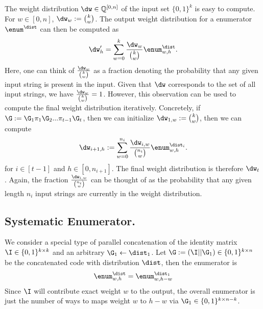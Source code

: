 The weight distribution $\dw\in \mathbb{Q}^{[0,n]}$ of the input set $\{0,1\}^k$ is easy to compute. For $w\in[0,n]$, $\dw_w:={k\choose w}$. The output weight distribution for a enumerator $\enum^\dist$ can then be computed as
$$
\dw'_{h} = \sum_{w=0}^k \frac{\dw_w}{{k\choose w}} \enum^\dist_{w,h}.
$$
Here, one can think of $ \frac{\dw_w}{{k\choose w}}$ as a fraction denoting the probability that any given input string is present in the input. Given that $\dw$ corresponds to the set of all input strings, we have $ \frac{\dw_w}{{k\choose w}}=1$.
However, this observation can be used to compute the final weight distribution iteratively. Concretely, if $\G:=\G_1\pi_1\G_2 ... \pi_{t-1}\G_t$, then we can initialize $\dw_{1,w}:={k\choose w}$, then we can compute
$$
\dw_{i+1, h}:=\sum_{w=0}^{n_i} \frac{\dw_{i,w}}{{n_i\choose w}} \enum^{\dist_i}_{w,h}.
$$
for $i\in [t-1]$ and $h\in [0,n_{i+1}]$. The final weight distribution is therefore $\dw_t$. Again, the fraction $ \frac{\dw_{i,w}}{{n_i\choose w}}$ can be thought of as the probability that any given length $n_i$ input strings are currently in the weight distribution.



\subsection{Systematic Enumerator.}\label{ssec:senum}
We consider a special type of parallel concatenation of the identity matrix $\I\in \{0,1\}^{k\times k}$ and an arbitrary $\G_1\gets\dist_1$. Let $\G:=(\I||\G_1)\in \{0,1\}^{k\times n}$ be the concatenated code with distribution $\dist$, then the enumerator is
$$
\enum^\dist_{w,h}=\enum_{w,h-w}^{\dist_1}
$$
Since $\I$ will contribute exact weight $w$ to the output, the overall enumerator is just the number of ways to maps weight $w$ to $h-w$ via $\G_1\in \{0,1\}^{k\times n-k}$.

